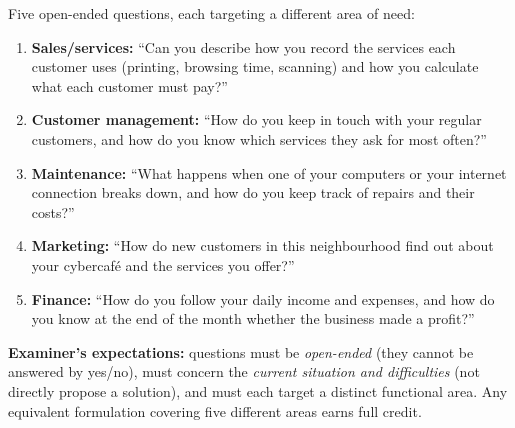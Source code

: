 \documentclass[11pt]{article}
\begin{document}
\begin{corrige}
Five open-ended questions, each targeting a different area of need:

\begin{enumerate}
\item \textbf{Sales/services:} ``Can you describe how you record the services each customer uses (printing, browsing time, scanning) and how you calculate what each customer must pay?''
\item \textbf{Customer management:} ``How do you keep in touch with your regular customers, and how do you know which services they ask for most often?''
\item \textbf{Maintenance:} ``What happens when one of your computers or your internet connection breaks down, and how do you keep track of repairs and their costs?''
\item \textbf{Marketing:} ``How do new customers in this neighbourhood find out about your cybercafé and the services you offer?''
\item \textbf{Finance:} ``How do you follow your daily income and expenses, and how do you know at the end of the month whether the business made a profit?''
\end{enumerate}

\textbf{Examiner's expectations:} questions must be \emph{open-ended} (they cannot be answered by yes/no), must concern the \emph{current situation and difficulties} (not directly propose a solution), and must each target a distinct functional area. Any equivalent formulation covering five different areas earns full credit.
\end{corrige}
\end{document}
